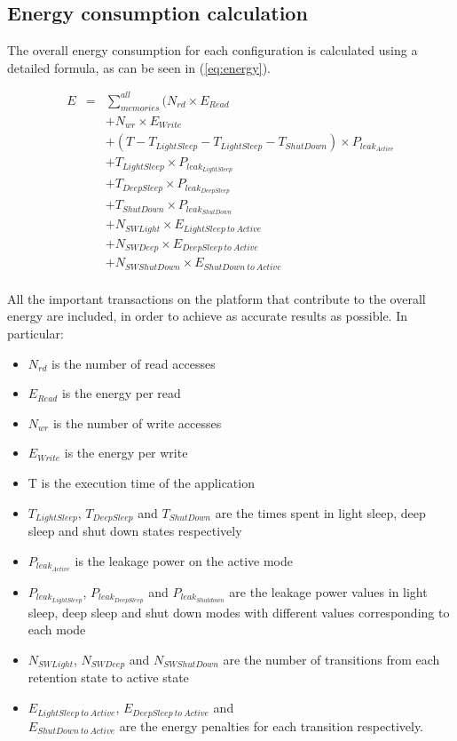 \documentclass{acm_proc_article-sp}
\begin{document}
\subsection{Energy consumption calculation}

The overall energy consumption for each configuration is calculated using a detailed formula, as can be seen in (\ref{eq:energy}). 

\setlength{\arraycolsep}{0.0em}
\begin{eqnarray}
\label{eq:energy}
 E &{}= {}&\sum\limits_{memories}^{all}  ( N_{rd} \times E_{Read} \nonumber\\
		&&+ N_{wr} \times E_{Write} \nonumber\\
		&&+ (T - T_{LightSleep} - T_{LightSleep} - T_{ShutDown}) \times P_{leak_{Active}} \nonumber\\
		&&+ T_{LightSleep} \times P_{leak_{LightSleep}} \nonumber\\
		&&+ T_{DeepSleep} \times P_{leak_{DeepSleep}} \nonumber\\
		&&+ T_{ShutDown} \times P_{leak_{ShutDown}} \nonumber\\ 
		&& + N_{SWLight} \times E_{LightSleep \: to \: Active} \nonumber\\
		&& + N_{SWDeep} \times E_{DeepSleep \: to \: Active} \nonumber\\
		&& + N_{SWShutDown} \times E_{ShutDown \: to \: Active} \nonumber\\
\end{eqnarray}
\setlength{\arraycolsep}{5pt}

All the important transactions on the platform that contribute to the overall energy are included, in order to achieve as accurate results as possible. In particular:
\begin{itemize}
\item $N_{rd}$ is the number of read accesses
\item $E_{Read}$ is the energy per read
\item $N_{wr}$ is the number of write accesses 
\item $E_{Write}$ is the energy per write 
\item T is the execution time of the application
\item $T_{LightSleep}$, $T_{DeepSleep}$ and $T_{ShutDown}$ are the times spent in light sleep, deep sleep and shut down states respectively
\item $P_{leak_{Active}}$ is the leakage power on the active mode 
\item $P_{leak_{LightSleep}}$, $P_{leak_{DeepSleep}}$ and $P_{leak_{Shutdown}}$ are the leakage power values in light sleep, deep sleep and shut down modes with different values corresponding to each mode 
\item $N_{SWLight}$, $N_{SWDeep}$ and $N_{SWShutDown}$ are the number of transitions from each retention state to active state
\item $E_{LightSleep \: to \: Active}$, $E_{DeepSleep \: to \: Active}$ and \\ $E_{ShutDown \: to \: Active}$  are the energy penalties for each transition respectively.
\end{itemize}
\end{document}
